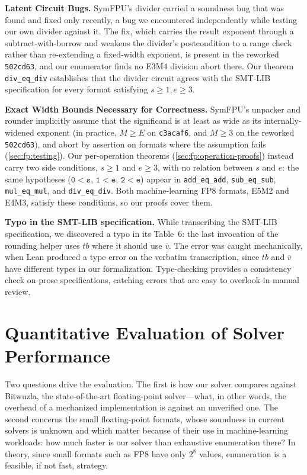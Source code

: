 \noindent\textbf{Latent Circuit Bugs.}
SymFPU's divider carried a soundness bug that was found and fixed only
recently, a bug we encountered independently while testing our own divider
against it. The fix, which carries the result exponent through a subtract-with-borrow
and weakens the divider's postcondition to a range check rather than re-extending a
fixed-width exponent, is present in the reworked \texttt{502cd63}, and our enumerator
finds no E3M4 division abort there.
Our theorem \texttt{div\_eq\_div}
establishes that the divider circuit agrees with the SMT-LIB specification for every
format satisfying $s \geq 1, e \geq 3$.

\noindent\textbf{Exact Width Bounds Necessary for Correctness.}
SymFPU's unpacker and rounder implicitly assume that the significand is at
least as wide as its internally-widened exponent (in practice, $M \geq E$ on
\texttt{c3acaf6}, and $M \geq 3$ on the reworked \texttt{502cd63}), and abort by
assertion on formats where the assumption fails (\cref{sec:fp:testing}).
Our per-operation theorems (\cref{sec:fp:operation-proofs}) instead carry two side
conditions, $s \geq 1$ and $e \geq 3$, with no relation between $s$ and $e$: the same
hypotheses ($\mathtt{0 < s}$, $\mathtt{1 < e}$, $\mathtt{2 < e}$) appear in
\texttt{add\_eq\_add}, \texttt{sub\_eq\_sub}, \texttt{mul\_eq\_mul}, and
\texttt{div\_eq\_div}. Both machine-learning FP8 formats, E5M2 and E4M3, satisfy these
conditions, so our proofs cover them.

\noindent\textbf{Typo in the SMT-LIB specification.}
While transcribing the SMT-LIB specification, we discovered a typo in its
Table~6: the last invocation of the rounding helper uses $tb$ where it should
use $\overline{v}$.
The error was caught mechanically, when Lean produced a type error on the verbatim
transcription, since $tb$ and $\overline{v}$ have different types in our
formalization.
Type-checking provides a consistency check on prose
specifications, catching errors that are easy to overlook in manual review.



\section{Quantitative Evaluation of Solver Performance}
\label{sec:fp:evaluation}

Two questions drive the evaluation. The first is how our solver compares against
Bitwuzla, the state-of-the-art floating-point solver---what, in other words, the
overhead of a mechanized implementation is against an unverified one. The second
concerns the small floating-point formats, whose soundness in current solvers is
unknown and which matter because of their use in machine-learning workloads: how
much faster is our solver than exhaustive enumeration there? In theory, since
small formats such as FP8 have only $2^8$ values, enumeration is a feasible, if
not fast, strategy.


